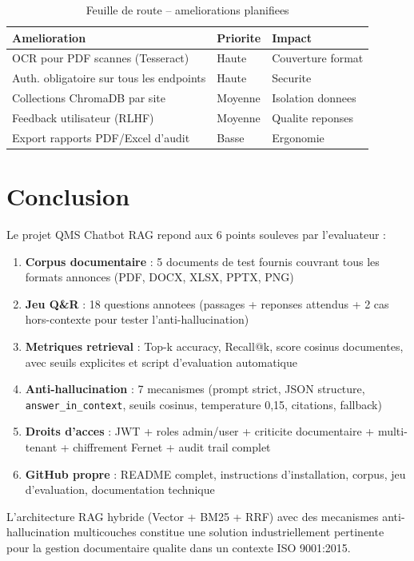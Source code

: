 \documentclass[12pt,a4paper]{article}
\begin{document}
\begin{table}[h]
\centering
\caption{Feuille de route -- ameliorations planifiees}
\begin{tabular}{lll}
\toprule
\textbf{Amelioration} & \textbf{Priorite} & \textbf{Impact} \\
\midrule
OCR pour PDF scannes (Tesseract) & Haute & Couverture format \\
Auth. obligatoire sur tous les endpoints & Haute & Securite \\
Collections ChromaDB par site & Moyenne & Isolation donnees \\
Feedback utilisateur (RLHF) & Moyenne & Qualite reponses \\
Export rapports PDF/Excel d'audit & Basse & Ergonomie \\
\bottomrule
\end{tabular}
\end{table}

\section*{Conclusion}

Le projet QMS Chatbot RAG repond aux 6 points souleves par l'evaluateur :

\begin{enumerate}
  \item[$\checkmark$] \textbf{Corpus documentaire} : 5 documents de test fournis couvrant
        tous les formats annonces (PDF, DOCX, XLSX, PPTX, PNG)
  \item[$\checkmark$] \textbf{Jeu Q\&R} : 18 questions annotees (passages + reponses attendus
        + 2 cas hors-contexte pour tester l'anti-hallucination)
  \item[$\checkmark$] \textbf{Metriques retrieval} : Top-k accuracy, Recall@k, score cosinus
        documentes, avec seuils explicites et script d'evaluation automatique
  \item[$\checkmark$] \textbf{Anti-hallucination} : 7 mecanismes (prompt strict, JSON structure,
        \texttt{answer\_in\_context}, seuils cosinus, temperature 0,15, citations, fallback)
  \item[$\checkmark$] \textbf{Droits d'acces} : JWT + roles admin/user + criticite documentaire
        + multi-tenant + chiffrement Fernet + audit trail complet
  \item[$\checkmark$] \textbf{GitHub propre} : README complet, instructions d'installation,
        corpus, jeu d'evaluation, documentation technique
\end{enumerate}

L'architecture RAG hybride (Vector + BM25 + RRF) avec des mecanismes anti-hallucination
multicouches constitue une solution industriellement pertinente pour la gestion documentaire
qualite dans un contexte ISO 9001:2015.
\end{document}
